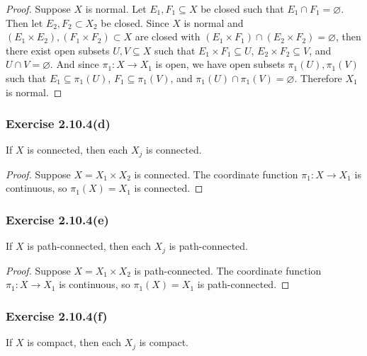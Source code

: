 \documentclass[12pt]{article}
\newenvironment{problem}
    {\begin{lrbox}{\mybox}\begin{minipage}{\textwidth-10pt}}
    {\end{minipage}\end{lrbox}\framebox[6.5in]{\usebox{\mybox}}}
\let\emptyset\varnothing
\begin{document}
\begin{proof}
    Suppose $X$ is normal. Let $E_1,F_1\subseteq X$ be closed such that $E_1\cap F_1 =\emptyset$. Then let $E_2,F_2\subset X_2$ be closed. Since $X$ is normal and $(E_1\times E_2),(F_1\times F_2)\subset X$ are closed with $(E_1\times F_1)\cap (E_2\times F_2) = \emptyset$, then there exist open subsets $U,V\subseteq X$ such that $E_1\times F_1 \subseteq U$, $E_2\times F_2\subseteq V$, and $U\cap V = \emptyset$. And since $\pi_1:X\to X_1$ is open, we have open subsets $\pi_1(U),\pi_1(V)$ such that $E_1\subseteq\pi_1(U)$, $F_1\subseteq\pi_1(V)$, and $\pi_1(U)\cap\pi_1(V) = \emptyset$. Therefore $X_1$ is normal.
    
\end{proof}

\subsubsection*{Exercise 2.10.4(d)}
\begin{problem}
    If $X$ is connected, then each $X_j$ is connected.
\end{problem}

\begin{proof}
    Suppose $X=X_1\times X_2$ is connected. The coordinate function $\pi_1:X\to X_1$ is continuous, so $\pi_1(X)=X_1$ is connected.
\end{proof}

\subsubsection*{Exercise 2.10.4(e)}
\begin{problem}
    If $X$ is path-connected, then each $X_j$ is path-connected.
\end{problem}

\begin{proof}
    Suppose $X=X_1\times X_2$ is path-connected. The coordinate function $\pi_1:X\to X_1$ is continuous, so $\pi_1(X)=X_1$ is path-connected.
    
\end{proof}

\subsubsection*{Exercise 2.10.4(f)}
\begin{problem}
    If $X$ is compact, then each $X_j$ is compact.
\end{problem}
\end{document}
